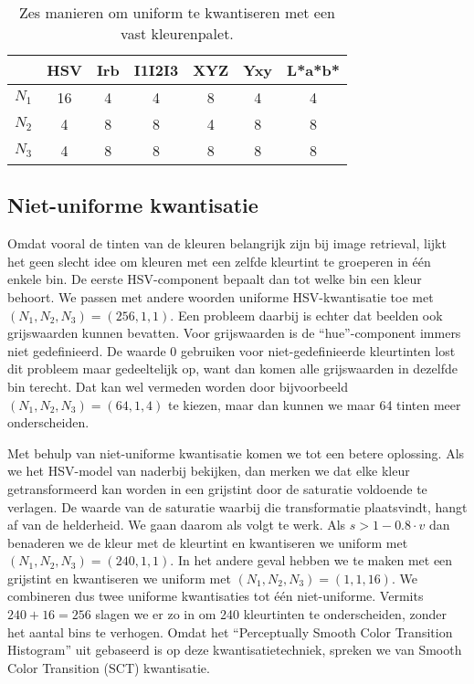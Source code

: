 \begin{table}[bp]
\vspace{5pt}
\centering
\begin{tabular}{c|cccccc}
 		& HSV & Irb & I1I2I3 & XYZ & Yxy & L*a*b* \\
\hline
$N_1$ 	& 16 & 4 & 4 & 8 & 4 & 4 \\
$N_2$	& 4  & 8 & 8 & 4 & 8 & 8 \\
$N_3$	& 4  & 8 & 8 & 8 & 8 & 8 \\
\end{tabular}
\vspace{5pt}
\caption{\label{tab:uniforme_kwantisatie}Zes manieren om uniform te kwantiseren met een vast 
kleurenpalet.}
\end{table}


\subsection{Niet-uniforme kwantisatie}

Omdat vooral de tinten van de kleuren belangrijk zijn bij image retrieval, 
lijkt het geen slecht idee om kleuren met een zelfde kleurtint te groeperen in 
\'e\'en enkele bin. De eerste HSV-component bepaalt dan tot welke bin een kleur behoort. We passen
met andere woorden uniforme HSV-kwantisatie toe met $(N_1,N_2,N_3)=(256,1,1)$. Een probleem daarbij 
is echter dat beelden ook grijswaarden kunnen bevatten. Voor grijswaarden is de ``hue''-component immers 
niet gedefinieerd. De waarde 0 gebruiken voor niet-gedefinieerde kleurtinten lost dit probleem maar 
gedeeltelijk op, want dan komen alle grijswaarden in dezelfde bin terecht. Dat kan wel vermeden worden 
door bijvoorbeeld $(N_1,N_2,N_3)=(64,1,4)$ te kiezen, maar dan kunnen we maar 64 tinten meer onderscheiden.

Met behulp van niet-uniforme kwantisatie komen we tot een betere oplossing. Als we het HSV-model van naderbij
bekijken, dan merken we dat elke kleur getransformeerd kan worden in een grijstint door de saturatie
voldoende te verlagen. De waarde van de saturatie waarbij die transformatie plaatsvindt, hangt af
van de helderheid. We gaan daarom als volgt te werk. Als $s > 1 - 0.8 \cdot v$ dan benaderen we de kleur
met de kleurtint en kwantiseren we uniform met $(N_1,N_2,N_3)=(240,1,1)$. In het andere geval hebben we
te maken met een grijstint en kwantiseren we uniform met $(N_1,N_2,N_3)=(1,1,16)$. We combineren dus
twee uniforme kwantisaties tot \'e\'en niet-uniforme. Vermits $240 + 16 = 256$
slagen we er zo in om 240 kleurtinten te onderscheiden, zonder het aantal bins te verhogen. Omdat het
``Perceptually Smooth Color Transition Histogram'' uit \cite{sural:perceptually_smooth_histogram} 
gebaseerd is op deze kwantisatietechniek, spreken we van Smooth Color Transition (SCT) kwantisatie.  

